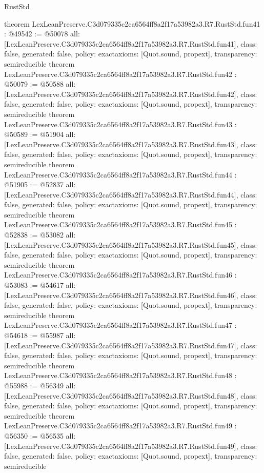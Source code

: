 \begin{lexlean}{RustStd}
\begin{coremodule}
{}
theorem LexLeanPreserve.C3d079335c2ca6564ff8a2f17a53982a3.R7.RustStd.fun41 : @49542 := @50078 {
  all: [LexLeanPreserve.C3d079335c2ca6564ff8a2f17a53982a3.R7.RustStd.fun41],
  class: false,
  generated: false,
  policy: exact{axioms: [Quot.sound, propext]},
  transparency: semireducible
}
theorem LexLeanPreserve.C3d079335c2ca6564ff8a2f17a53982a3.R7.RustStd.fun42 : @50079 := @50588 {
  all: [LexLeanPreserve.C3d079335c2ca6564ff8a2f17a53982a3.R7.RustStd.fun42],
  class: false,
  generated: false,
  policy: exact{axioms: [Quot.sound, propext]},
  transparency: semireducible
}
theorem LexLeanPreserve.C3d079335c2ca6564ff8a2f17a53982a3.R7.RustStd.fun43 : @50589 := @51904 {
  all: [LexLeanPreserve.C3d079335c2ca6564ff8a2f17a53982a3.R7.RustStd.fun43],
  class: false,
  generated: false,
  policy: exact{axioms: [Quot.sound, propext]},
  transparency: semireducible
}
theorem LexLeanPreserve.C3d079335c2ca6564ff8a2f17a53982a3.R7.RustStd.fun44 : @51905 := @52837 {
  all: [LexLeanPreserve.C3d079335c2ca6564ff8a2f17a53982a3.R7.RustStd.fun44],
  class: false,
  generated: false,
  policy: exact{axioms: [Quot.sound, propext]},
  transparency: semireducible
}
theorem LexLeanPreserve.C3d079335c2ca6564ff8a2f17a53982a3.R7.RustStd.fun45 : @52838 := @53082 {
  all: [LexLeanPreserve.C3d079335c2ca6564ff8a2f17a53982a3.R7.RustStd.fun45],
  class: false,
  generated: false,
  policy: exact{axioms: [Quot.sound, propext]},
  transparency: semireducible
}
theorem LexLeanPreserve.C3d079335c2ca6564ff8a2f17a53982a3.R7.RustStd.fun46 : @53083 := @54617 {
  all: [LexLeanPreserve.C3d079335c2ca6564ff8a2f17a53982a3.R7.RustStd.fun46],
  class: false,
  generated: false,
  policy: exact{axioms: [Quot.sound, propext]},
  transparency: semireducible
}
theorem LexLeanPreserve.C3d079335c2ca6564ff8a2f17a53982a3.R7.RustStd.fun47 : @54618 := @55987 {
  all: [LexLeanPreserve.C3d079335c2ca6564ff8a2f17a53982a3.R7.RustStd.fun47],
  class: false,
  generated: false,
  policy: exact{axioms: [Quot.sound, propext]},
  transparency: semireducible
}
theorem LexLeanPreserve.C3d079335c2ca6564ff8a2f17a53982a3.R7.RustStd.fun48 : @55988 := @56349 {
  all: [LexLeanPreserve.C3d079335c2ca6564ff8a2f17a53982a3.R7.RustStd.fun48],
  class: false,
  generated: false,
  policy: exact{axioms: [Quot.sound, propext]},
  transparency: semireducible
}
theorem LexLeanPreserve.C3d079335c2ca6564ff8a2f17a53982a3.R7.RustStd.fun49 : @56350 := @56535 {
  all: [LexLeanPreserve.C3d079335c2ca6564ff8a2f17a53982a3.R7.RustStd.fun49],
  class: false,
  generated: false,
  policy: exact{axioms: [Quot.sound, propext]},
  transparency: semireducible
}
\end{coremodule}
\end{lexlean}
